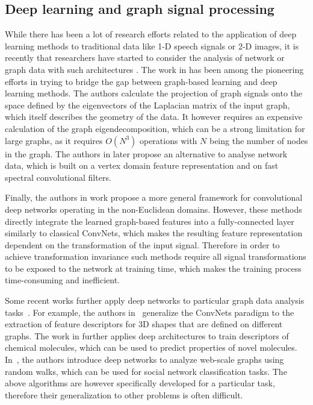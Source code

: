 \documentclass[10pt,journal,compsoc]{IEEEtran}
\begin{document}
	\subsection{Deep learning and graph signal processing}

	While there has been a lot of research efforts related to the application of deep learning methods to traditional data like 1-D speech signals or 2-D images, it is recently that researchers have started to consider the analysis of network or graph data with such architectures \cite{bb:kipf2016semi, bb:henaff2015deep, bb:nips_fingerprint, bb:Structural-RNN}.
	The work in \cite{bb:bruna-iclr-14} has been among the pioneering efforts in trying to bridge the gap between graph-based learning and deep learning methods. The authors calculate the projection of graph signals onto the space defined by the eigenvectors of the Laplacian matrix of the input graph, which itself describes the geometry of the data. It however requires an expensive calculation of the graph eigendecomposition, which can be a strong limitation for large graphs, as it requires $O(N^3)$ operations with $N$ being the number of nodes in the graph. The authors in \cite{bb:Mikhael} later propose an alternative to analyse network data, which is built on a vertex domain feature representation and on fast spectral convolutional filters.

	Finally, the authors in work \cite{bb:MontiBMRSB17} propose a more general framework for convolutional deep networks operating in the non-Euclidean domains. However, these methods directly integrate the learned graph-based features into a fully-connected layer similarly to classical ConvNets, which makes the resulting feature representation dependent on the transformation of the input signal. Therefore in order to achieve transformation invariance such methods require all signal transformations to be exposed to the network at training time, which makes the training process time-consuming and inefficient.

	Some recent works further apply deep networks to particular graph data analysis tasks~\cite{bb:bronstein2017geometric}. For example, the authors in~\cite{bb:bronsteingeodesicconv} generalize the ConvNets paradigm to the extraction of feature descriptors for 3D shapes that are defined on different graphs. The work in \cite{bb:nips_fingerprint} further applies deep architectures to train descriptors of chemical molecules, which can be used to predict properties of novel molecules. In~\cite{bb:deepwalk}, the  authors introduce deep networks to analyze web-scale graphs using random walks, which can be used for social network classification tasks. The above algorithms are however specifically developed for a particular task, therefore their generalization to other problems is often difficult.
\end{document}
